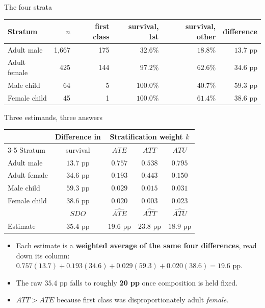 \documentclass[
  11pt,
  ignorenonframetext,
  aspectratio=169,
]{beamer}
\providecommand{\tightlist}{%
  \setlength{\itemsep}{0pt}\setlength{\parskip}{0pt}}
\begin{document}
\begin{frame}{The four strata}
\protect{}\label{the-four-strata}
\begin{center}
\begin{tabular}{lrrrrr}
\toprule
Stratum & $n$ & first class & survival, 1st & survival, other & difference \\
\midrule
Adult male   & 1,667 & 175 & $32.6\%$  & $18.8\%$ & $13.7$ pp \\
Adult female &   425 & 144 & $97.2\%$  & $62.6\%$ & $34.6$ pp \\
Male child   &    64 &   5 & $100.0\%$ & $40.7\%$ & $59.3$ pp \\
Female child &    45 &   1 & $100.0\%$ & $61.4\%$ & $38.6$ pp \\
\bottomrule
\end{tabular}
\end{center}

\vspace{0.4em}
\end{frame}

\begin{frame}{Three estimands, three answers}
\protect{}\label{three-estimands-three-answers}
\begin{center}
\begin{tabular}{lcccc}
\toprule
 & Difference in & \multicolumn{3}{c}{Stratification weight $k$} \\
\cmidrule(lr){3-5}
Stratum & survival & $ATE$ & $ATT$ & $ATU$ \\
\midrule
Adult male   & $13.7$ pp & $0.757$ & $0.538$ & $0.795$ \\
Adult female & $34.6$ pp & $0.193$ & $0.443$ & $0.150$ \\
Male child   & $59.3$ pp & $0.029$ & $0.015$ & $0.031$ \\
Female child & $38.6$ pp & $0.020$ & $0.003$ & $0.023$ \\
\midrule
             & $SDO$     & $\widehat{ATE}$ & $\widehat{ATT}$ & $\widehat{ATU}$ \\
Estimate     & $35.4$ pp & $19.6$ pp & $23.8$ pp & $18.9$ pp \\
\bottomrule
\end{tabular}
\end{center}

\vspace{0.2em}

\begin{itemize}
\tightlist
\item
  Each estimate is a \textbf{weighted average of the same four
  differences}, read down its column:
  \(0.757(13.7) + 0.193(34.6) + 0.029(59.3) + 0.020(38.6) = 19.6\) pp.
\item
  The raw \(35.4\) pp falls to roughly \textbf{20 pp} once composition
  is held fixed.
\item
  \(ATT > ATE\) because first class was disproportionately adult
  \emph{female}.
\end{itemize}
\end{frame}
\end{document}

